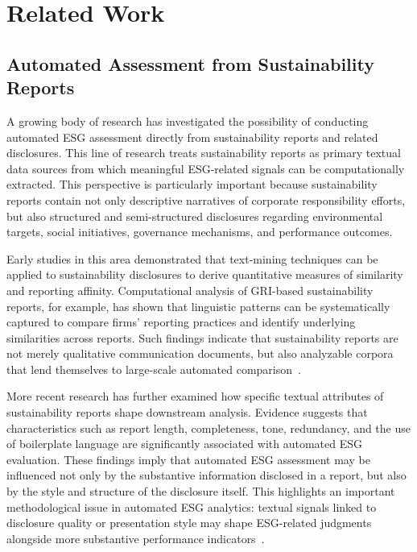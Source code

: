 \documentclass[sn-mathphys, oneside]{sn-jnl}
\begin{document}
\section{Related Work}

\subsection{Automated Assessment from Sustainability Reports}

A growing body of research has investigated the possibility of conducting automated ESG assessment directly from sustainability reports and related disclosures. This line of research treats sustainability reports as primary textual data sources from which meaningful ESG-related signals can be computationally extracted. This perspective is particularly important because sustainability reports contain not only descriptive narratives of corporate responsibility efforts, but also structured and semi-structured disclosures regarding environmental targets, social initiatives, governance mechanisms, and performance outcomes.

Early studies in this area demonstrated that text-mining techniques can be applied to sustainability disclosures to derive quantitative measures of similarity and reporting affinity. Computational analysis of GRI-based sustainability reports, for example, has shown that linguistic patterns can be systematically captured to compare firms' reporting practices and identify underlying similarities across reports. Such findings indicate that sustainability reports are not merely qualitative communication documents, but also analyzable corpora that lend themselves to large-scale automated comparison~\cite{gutierrez2022nlp}.

More recent research has further examined how specific textual attributes of sustainability reports shape downstream analysis. Evidence suggests that characteristics such as report length, completeness, tone, redundancy, and the use of boilerplate language are significantly associated with automated ESG evaluation. These findings imply that automated ESG assessment may be influenced not only by the substantive information disclosed in a report, but also by the style and structure of the disclosure itself. This highlights an important methodological issue in automated ESG analytics: textual signals linked to disclosure quality or presentation style may shape ESG-related judgments alongside more substantive performance indicators~\cite{huang2024textual}.
\end{document}
